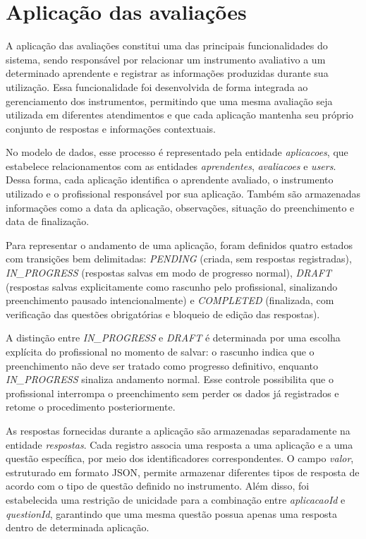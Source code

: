 \section{Aplicação das avaliações}

A aplicação das avaliações constitui uma das principais funcionalidades do sistema, sendo responsável por relacionar um instrumento avaliativo a um determinado aprendente e registrar as informações produzidas durante sua utilização. Essa funcionalidade foi desenvolvida de forma integrada ao gerenciamento dos instrumentos, permitindo que uma mesma avaliação seja utilizada em diferentes atendimentos e que cada aplicação mantenha seu próprio conjunto de respostas e informações contextuais.

No modelo de dados, esse processo é representado pela entidade \textit{aplicacoes}, que estabelece relacionamentos com as entidades \textit{aprendentes}, \textit{avaliacoes} e \textit{users}. Dessa forma, cada aplicação identifica o aprendente avaliado, o instrumento utilizado e o profissional responsável por sua aplicação. Também são armazenadas informações como a data da aplicação, observações, situação do preenchimento e data de finalização.

Para representar o andamento de uma aplicação, foram definidos quatro estados com transições bem delimitadas: \textit{PENDING} (criada, sem respostas registradas), \textit{IN\_PROGRESS} (respostas salvas em modo de progresso normal), \textit{DRAFT} (respostas salvas explicitamente como rascunho pelo profissional, sinalizando preenchimento pausado intencionalmente) e \textit{COMPLETED} (finalizada, com verificação das questões obrigatórias e bloqueio de edição das respostas). 

A distinção entre \textit{IN\_PROGRESS} e \textit{DRAFT} é determinada por uma escolha explícita do profissional no momento de salvar: o rascunho indica que o preenchimento não deve ser tratado como progresso definitivo, enquanto \textit{IN\_PROGRESS} sinaliza andamento normal. Esse controle possibilita que o profissional interrompa o preenchimento sem perder os dados já registrados e retome o procedimento posteriormente.

As respostas fornecidas durante a aplicação são armazenadas separadamente na entidade \textit{respostas}. Cada registro associa uma resposta a uma aplicação e a uma questão específica, por meio dos identificadores correspondentes. O campo \textit{valor}, estruturado em formato JSON, permite armazenar diferentes tipos de resposta de acordo com o tipo de questão definido no instrumento. Além disso, foi estabelecida uma restrição de unicidade para a combinação entre \textit{aplicacaoId} e \textit{questionId}, garantindo que uma mesma questão possua apenas uma resposta dentro de determinada aplicação.


